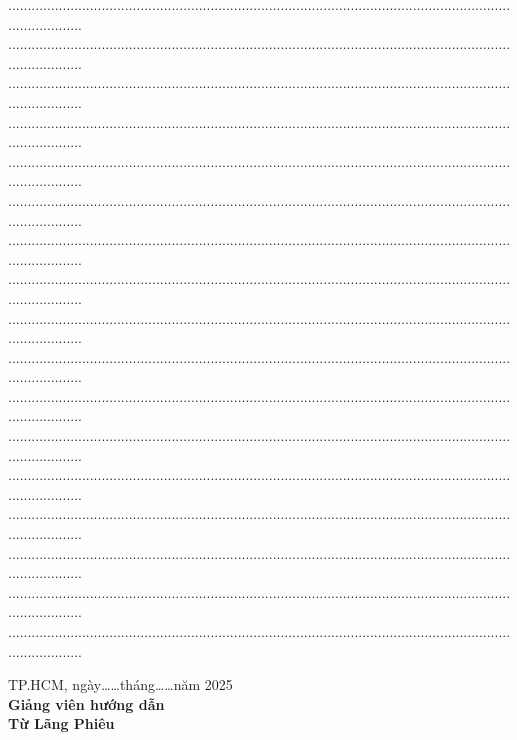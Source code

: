 \documentclass[a4paper]{article}
\begin{document}
\begin{center}
....................................................................................................................................................
....................................................................................................................................................
....................................................................................................................................................
....................................................................................................................................................
....................................................................................................................................................
....................................................................................................................................................
....................................................................................................................................................
....................................................................................................................................................
....................................................................................................................................................
....................................................................................................................................................
....................................................................................................................................................
....................................................................................................................................................
....................................................................................................................................................
....................................................................................................................................................
....................................................................................................................................................
....................................................................................................................................................
....................................................................................................................................................
\vspace{1cm}
\begin{flushright}
\begin{minipage}{7cm}
\centering
\color{black}
TP.HCM, ngày\ldots\ldots tháng\ldots\ldots năm 2025\\
\textbf{Giảng viên hướng dẫn}\\
\vspace{3cm}
\textbf{Từ Lãng Phiêu}
\end{minipage}
\end{flushright}
\end{center}
\newpage
\end{document}
